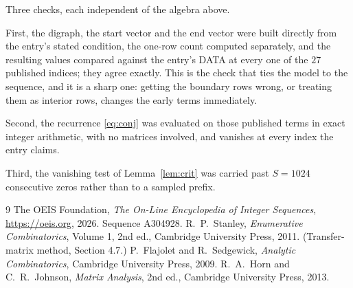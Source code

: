 \documentclass[11pt,a4paper]{article}
\theoremstyle{plain}
\theoremstyle{definition}
\begin{document}
Three checks, each independent of the algebra above.

First, the digraph, the start vector and the end vector were built directly from the
entry's stated condition, the one-row count computed separately, and the resulting values
compared against the entry's DATA at every one of the $27$ published indices; they
agree exactly. This is the check that ties the model to the sequence, and it is a sharp one:
getting the boundary rows wrong, or treating them as interior rows, changes the early terms
immediately.

Second, the recurrence \eqref{eq:conj} was evaluated on those published terms in exact
integer arithmetic, with no matrices involved, and vanishes at every index the entry claims.

Third, the vanishing test of Lemma~\ref{lem:crit} was carried past $S=1024$ consecutive
zeros rather than to a sampled prefix.

\begin{thebibliography}{9}
 The OEIS Foundation, \emph{The On-Line Encyclopedia of Integer
Sequences}, \url{https://oeis.org}, 2026. Sequence A304928.
 R.~P.~Stanley, \emph{Enumerative Combinatorics}, Volume 1, 2nd ed.,
Cambridge University Press, 2011. (Transfer-matrix method, Section 4.7.)
 P.~Flajolet and R.~Sedgewick, \emph{Analytic Combinatorics}, Cambridge
University Press, 2009.
 R.~A.~Horn and C.~R.~Johnson, \emph{Matrix Analysis}, 2nd ed., Cambridge
University Press, 2013.
\end{thebibliography}
\end{document}
